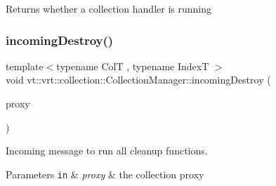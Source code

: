 \begin{DoxyReturn}{Returns}
whether a collection handler is running 
\end{DoxyReturn}
\mbox{\label{structvt_1_1vrt_1_1collection_1_1_collection_manager_a79d8ce89b21670fe0d482646aca4a2a4}} 
\subsubsection{\texorpdfstring{incoming\+Destroy()}{incomingDestroy()}}
{\footnotesize\ttfamily template$<$typename ColT , typename IndexT $>$ \\
void vt\+::vrt\+::collection\+::\+Collection\+Manager\+::incoming\+Destroy (\begin{DoxyParamCaption}\item[{\hyperlink{structvt_1_1vrt_1_1collection_1_1_collection_manager_a56458ed7f9bb22b631b9b3a745f42f94}{Collection\+Proxy\+Wrap\+Type}$<$ ColT, IndexT $>$ const \&}]{proxy }\end{DoxyParamCaption})\hspace{0.3cm}{\ttfamily [private]}}



Incoming message to run all cleanup functions. 


\begin{DoxyParams}[1]{Parameters}
\mbox{\tt in}  & {\em proxy} & the collection proxy \\
\hline
\end{DoxyParams}
\mbox{\label{structvt_1_1vrt_1_1collection_1_1_collection_manager_a57a03bda72fb30e3fc886111ff032819}} 
